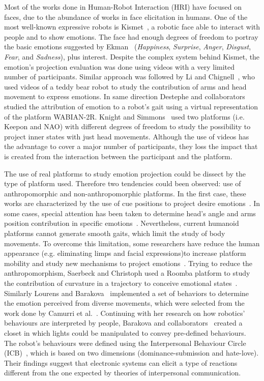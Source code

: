 Most of the works done in Human-Robot Interaction (HRI) have focused on faces, due to the abundance of works in face elicitation in humans. One of the most well-known expressive robots is Kismet~\cite{Breazeal2002}, a robotic face able to interact with people and to show emotions. The face had enough degrees of freedom to portray the basic emotions suggested by Ekman~\cite{Ekman2004} (\textit{Happiness}, \textit{Surprise}, \textit{Anger}, \textit{Disgust}, \textit{Fear}, and \textit{Sadness}), plus interest. 
Despite the complex system behind Kismet, the emotion's projection evaluation was done using videos with a very limited number of participants. Similar approach was followed by Li and Chignell~\cite{Li2011}, who used videos of a teddy bear robot to study the contribution of arms and head movement to express emotions. In same direction Destephe and collaborators~\cite{Destephe2013} studied the attribution of emotion to a robot's gait using a virtual representation of the platform WABIAN-2R. Knight and Simmons~\cite{knight2016} used two platforms (i.e. Keepon and NAO) with different degrees of freedom to study the possibility to project inner states with just head movements. Although the use of videos has the advantage to cover a major number of participants, they loss the impact that is created from the interaction between the participant and the platform.

The use of real platforms to study emotion projection could be dissect by the type of platform used. Therefore two tendencies could been observed: use of anthropomorphic and non-anthropomorphic platforms. In the first case, these works are characterized by the use of cue positions to project desire emotions~\cite{NAO2013}. In some cases, special attention has been taken to determine head's angle and arms position contribution in specific emotions~\cite{Brown2014}. 
Nevertheless, current humanoid platforms cannot generate smooth gaits, which limit the study of body movements. To overcome this limitation, some researchers have reduce the human appearance (e.g. eliminating limps and facial expressions)to increase platform mobility and study new mechanisms to project emotions~\cite{Arras2012}. Trying to reduce the anthropomorphism, Saerbeck and Christoph used a Roomba platform to study the contribution of curvature in a trajectory to conceive emotional states~\cite{Saerbeck2010}. Similarly Lourens and Barakova~\cite{BarakovaL10} implemented a set of behaviors to determine the emotion  perceived from diverse movements, which were selected from the  work done by Camurri et al.~\cite{pop00002}. Continuing with her research on how robotics' behaviours are interpreted by people, Barakova and collaborators~\cite{Barakova2013} created a closet in which lights could be manipulated to convey pre-defined behaviours. The robot's behaviours were defined using the Interpersonal Behaviour Circle (ICB)~\cite{Leary57}, which is based on two dimensions (dominance-submission and hate-love). Their findings suggest that electronic systems can elicit a type of reactions different from the one expected by theories of interpersonal communication.

